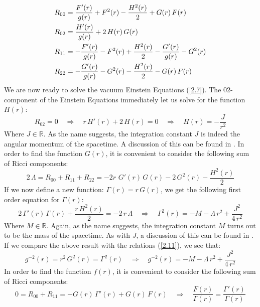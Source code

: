 %
%
\begin{align}
R_{00} & = \frac{F'(r)}{g(r)} + F^2(r) - \frac{H^2(r)}{2}
+ G(r) \, F(r)
\notag\\
R_{02} & = \frac{H'(r)}{g(r)} + 2 \, H(r) \, G(r)
\notag\\
R_{11} & = -\frac{F'(r)}{g(r)} - F^2(r) + \frac{H^2(r)}{2}
- \frac{G'(r)}{g(r)} - G^2(r)
\notag\\
R_{22} & = -\frac{G'(r)}{g(r)} - G^2(r) - \frac{H^2(r)}{2}
- G(r) \, F(r)
\end{align}
%
%
We are now ready to solve the vacuum Einstein Equations (\ref{2.7}). The $02$-component of the Einstein Equations immediately let us solve for the function $H(r)$:
%
%
\begin{equation}
R_{02} = 0
\quad \Rightarrow \quad
r \, H'(r) + 2 \, H(r) = 0
\quad \Rightarrow \quad
H(r) = -\frac{J}{r^2}
\end{equation}
%
%
Where $J \in \mathbb{R}$. As the name suggests, the integration constant $J$ is indeed the angular momentum of the spacetime. A discussion of this can be found in \cite{2+1 black hole}. In order to find the function $G(r)$, it is convenient to consider the following sum of Ricci components:
%
%
\begin{equation}
2 \, \Lambda = R_{00} + R_{11} + R_{22} = - 2 r \, \, G'(r) \, G(r)
- 2 \, G^2(r)
- \frac{H^2(r)}{2}
\end{equation}
%
%
If we now define a new function: $\Gamma(r) = r \, G(r)$, we get the following first order equation for $\Gamma(r)$:
%
%
\begin{equation}
2 \, \Gamma'(r) \, \Gamma(r)
+ \frac{r \, H^2(r)}{2}
= - 2 \, r \, \Lambda
\quad \Rightarrow \quad
\Gamma^2(r) = -M - \Lambda \, r^2 + \frac{J^2}{4 \, r^2}
\end{equation}
%
%
Where $M \in \mathbb{R}$. Again, as the name suggests, the integration constant $M$ turns out to be the mass of the spacetime. As with $J$, a discussion of this can be found in \cite{2+1 black hole}. If we compare the above result with the relations (\ref{2.11}), we see that:
%
%
\begin{equation}
g^{-2}(r) = r^2 \, G^2(r) = \Gamma^2(r)
\quad \Rightarrow \quad
g^{-2}(r) = -M - \Lambda \, r^2 + \frac{J^2}{4 \, r^2}
\end{equation}
%
%
In order to find the function $f(r)$, it is convenient to consider the following sum of Ricci components:
%
%
\begin{equation}\label{2.12}
0 = R_{00} + R_{11} = - G(r) \, \Gamma'(r) + G(r) \, F(r)
\quad \Rightarrow \quad
\frac{F(r)}{\Gamma(r)} = \frac{\Gamma'(r)}{\Gamma(r)}
\end{equation}
